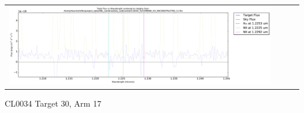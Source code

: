 \documentclass[10pt,letterpaper]{article}
\begin{document}
\begin{table}[h!]
\begin{center}
\begin{tabular}{ >{\centering\arraybackslash}m{2.5in} >{\centering\arraybackslash}m{2.5in} >{\centering\arraybackslash}m{2.5in} >{\centering\arraybackslash}m{2.3in} }
\includegraphics[scale=0.45]{../figures/CL0034_YJ/COMBINE_SCI_RECONSTRUCTED_11_Halpha.pdf}
\end{tabular}
\end{center}
\end{table}

\newpage
CL0034 Target 30, Arm 17 \\
\end{document}
